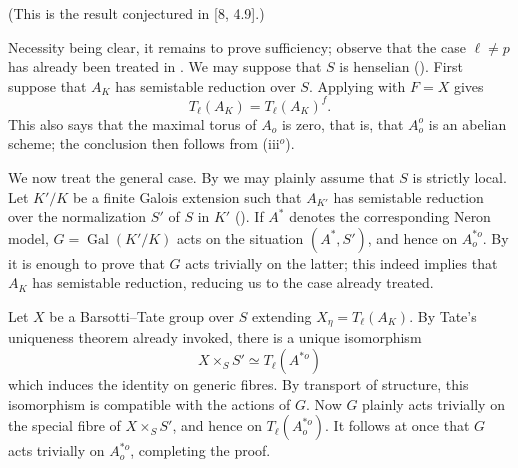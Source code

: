 (This is the result conjectured in [8, 4.9].)

Necessity being clear, it remains to prove sufficiency; observe that
the case $\ell\neq p$ has already been treated in . We may
suppose that $S$ is henselian (). First suppose that $A_K$ has
semistable reduction over $S$. Applying  with $F=X$ gives
\[
 T_\ell(A_K)=T_\ell(A_K)^f.
\]
This also says that the maximal torus of $A_o$ is zero, that is, that
$A_o^o$ is an abelian scheme; the conclusion then follows from
 (iii${}^o$).

We now treat the general case. By  we may plainly assume that
$S$ is strictly local. Let $K'/K$ be a finite Galois extension such
that $A_{K'}$ has semistable reduction over the normalization $S'$ of
$S$ in $K'$ (). If $A^*$ denotes the corresponding Neron model,
$G=\operatorname{Gal}(K'/K)$ acts on the situation $(A^*,S')$, and
hence on $A_o^{*o}$. By  it is enough to prove that $G$ acts
trivially on the latter; this indeed implies that $A_K$ has
semistable reduction, reducing us to the case already treated.

Let $X$ be a Barsotti--Tate group over $S$ extending
$X_\eta=T_\ell(A_K)$. By Tate's uniqueness theorem already invoked,
there is a unique isomorphism
\[
 X\times_S S'\simeq T_\ell(A^{*o})
\]
which induces the identity on generic fibres. By transport of
structure, this isomorphism is compatible with the actions of $G$.
Now $G$ plainly acts trivially on the special fibre of
$X\times_S S'$, and hence on $T_\ell(A_o^{*o})$. It follows at once
that $G$ acts trivially on $A_o^{*o}$, completing the proof.
